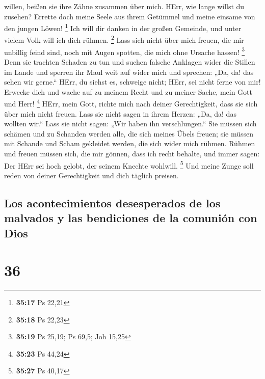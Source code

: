 willen, beißen sie ihre Zähne zusammen über mich.  HErr,
wie lange willst du zusehen? Errette doch meine Seele aus ihrem Getümmel
und meine einsame von den jungen Löwen! \footnote{\textbf{35:17} Ps
  22,21}  Ich will dir danken in der großen Gemeinde, und
unter vielem Volk will ich dich rühmen. \footnote{\textbf{35:18} Ps
  22,23}  Lass sich nicht über mich freuen, die mir
unbillig feind sind, noch mit Augen spotten, die mich ohne Ursache
hassen! \footnote{\textbf{35:19} Ps 25,19; Ps 69,5; Joh 15,25}
 Denn sie trachten Schaden zu tun und suchen falsche
Anklagen wider die Stillen im Lande  und sperren ihr Maul
weit auf wider mich und sprechen: „Da, da! das sehen wir gerne.``
 HErr, du siehst es, schweige nicht; HErr, sei nicht
ferne von mir!  Erwecke dich und wache auf zu meinem
Recht und zu meiner Sache, mein Gott und Herr! \footnote{\textbf{35:23}
  Ps 44,24}  HErr, mein Gott, richte mich nach deiner
Gerechtigkeit, dass sie sich über mich nicht freuen. 
Lass sie nicht sagen in ihrem Herzen: „Da, da! das wollten wir.`` Lass
sie nicht sagen: „Wir haben ihn verschlungen.``  Sie
müssen sich schämen und zu Schanden werden alle, die sich meines Übels
freuen; sie müssen mit Schande und Scham gekleidet werden, die sich
wider mich rühmen.  Rühmen und freuen müssen sich, die
mir gönnen, dass ich recht behalte, und immer sagen: Der HErr sei hoch
gelobt, der seinem Knechte wohlwill. \footnote{\textbf{35:27} Ps 40,17}
 Und meine Zunge soll reden von deiner Gerechtigkeit und
dich täglich preisen.

\hypertarget{los-acontecimientos-desesperados-de-los-malvados-y-las-bendiciones-de-la-comuniuxf3n-con-dios}{%
\subsection{Los acontecimientos desesperados de los malvados y las
bendiciones de la comunión con
Dios}\label{los-acontecimientos-desesperados-de-los-malvados-y-las-bendiciones-de-la-comuniuxf3n-con-dios}}

\hypertarget{section-35}{%
\section{36}\label{section-35}}

